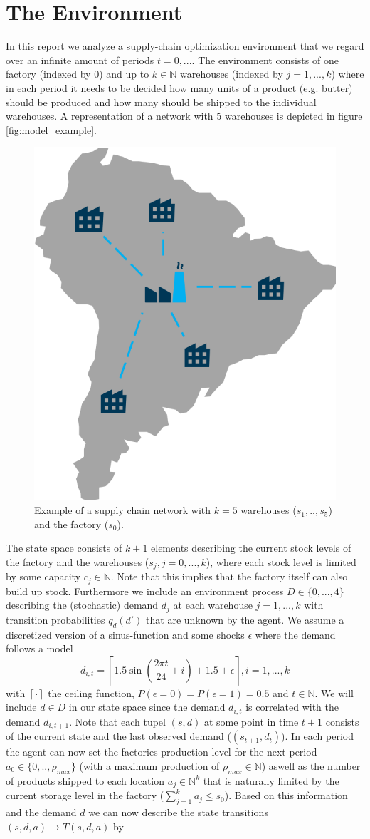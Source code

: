 \documentclass[journal, a4paper]{IEEEtran}
\theoremstyle{plain}
\theoremstyle{definition}
\begin{document}
\section{The Environment}
In this report we analyze a supply-chain optimization environment that we regard over an infinite amount of periods $t = 0, ...$. The environment consists of one factory (indexed by $0$) and up to $k \in \mathbb{N}$ warehouses (indexed by $j=1,...,k$) where in each period it needs to be decided how many units of a product (e.g. butter) should be produced and how many should be shipped to the individual warehouses. A representation of a network with 5 warehouses is depicted in figure \ref{fig:model_example}. 
\begin{figure}[h]
	\label{fig:model_example}
	\centering
	\includegraphics[width=0.4\columnwidth]{model.png}
	\caption{\label{a_figure}Example of a supply chain network with $k=5$ warehouses ($s_1, .., s_5$) and the factory ($s_0$).}
\end{figure}
The state space consists of $k+1$ elements describing the current stock levels of the factory and the warehouses ($s_j, j=0,...,k$), where each stock level is limited by some capacity $c_j \in \mathbb{N}$. Note that this implies that the factory itself can also build up stock. Furthermore we include an environment process $D \in \{0,..., 4\}$ describing the (stochastic) demand $d_j$ at each warehouse $j = 1,...,k$ with transition probabilities $q_d(d')$ that are unknown by the agent. We assume a discretized version of a sinus-function and some shocks $\epsilon$ where the demand follows a model 
\begin{equation}
	d_{i,t} = \left\lceil 1.5 \sin\left( \frac{2 \pi t}{24} + i\right) + 1.5 + \epsilon \right\rceil, i = 1,..., k
\end{equation}
with $\left\lceil \cdot \right\rceil$ the ceiling function, $P(\epsilon=0) = P(\epsilon=1) = 0.5$ and $t \in \mathbb{N}$. We will include $d \in D$ in our state space since the demand $d_{i, t}$ is correlated with the demand $d_{i, t+1}$. Note that each tupel $(s, d)$ at some point in time $t + 1$ consists of the current state and the last observed demand ($(s_{t+1}, d_t)$). In each period the agent can now set the factories production level for the next period $a_0 \in \{0,.., \rho_{max}\}$ (with a maximum production of $\rho_{max} \in \mathbb{N}$) aswell as the number of products shipped to each location $a_j \in \mathbb{N}^k$ that is naturally limited by the current storage level in the factory ($\sum_{j=1}^{k}a_j \leq s_0$). Based on this information and the demand $d$ we can now describe the state transitions $(s, d, a) \rightarrow T(s,d,a)$ by
\end{document}
